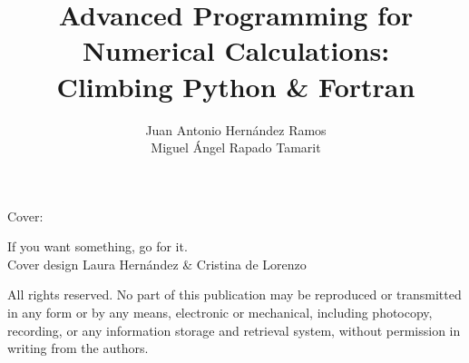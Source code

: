 \documentclass[a4paper,10pt,twoside,english]{book}
\title{{\fontsize{27}{33}\selectfont Advanced Programming for \\ Numerical Calculations: 
	 \\  \vspace{0.8cm} } 
	 {\fontsize{27}{33}\selectfont Climbing Python \& Fortran\\ }
	 }
\author{ Juan Antonio Hern\'andez Ramos\\ 	
  	         Miguel \'Angel Rapado Tamarit\\
            \vspace{5cm} } %
\date{  } %
\begin{document}
 
  
   
    \maketitle
    \thispagestyle{empty}   %
    
    
    \noindent  Cover: 
    
    \noindent If you want something, go for it.
    \\ Cover design Laura Hernández \& Cristina de Lorenzo
   
 
    \vfill  
    \begin{minipage}[b]{0.9\textwidth}
        
%        
        
    \end{minipage}
    
    \noindent
    All rights reserved.
    No part of this publication may be reproduced or transmitted in any form or by any means, electronic or mechanical, including photocopy, recording, or any information storage and retrieval system, without permission in writing from the authors. 
    \vspace{2\baselineskip}
    
\end{document}
